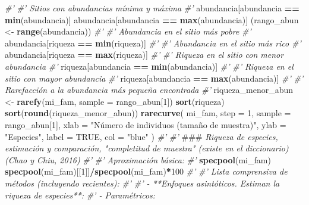 \documentclass[11pt,]{article}
\newenvironment{Shaded}{\begin{snugshade}}{\end{snugshade}}
\newcommand{\KeywordTok}[1]{\textcolor[rgb]{0.13,0.29,0.53}{\textbf{#1}}}
\newcommand{\DataTypeTok}[1]{\textcolor[rgb]{0.13,0.29,0.53}{#1}}
\newcommand{\DecValTok}[1]{\textcolor[rgb]{0.00,0.00,0.81}{#1}}
\newcommand{\StringTok}[1]{\textcolor[rgb]{0.31,0.60,0.02}{#1}}
\newcommand{\CommentTok}[1]{\textcolor[rgb]{0.56,0.35,0.01}{\textit{#1}}}
\newcommand{\OtherTok}[1]{\textcolor[rgb]{0.56,0.35,0.01}{#1}}
\newcommand{\OperatorTok}[1]{\textcolor[rgb]{0.81,0.36,0.00}{\textbf{#1}}}
\newcommand{\AlertTok}[1]{\textcolor[rgb]{0.94,0.16,0.16}{#1}}
\newcommand{\NormalTok}[1]{#1}
\begin{document}
\begin{Shaded}
\begin{Highlighting}[]
{{{{{{{{\CommentTok{#' }
\CommentTok{#' Sitios con abundancias mínima y máxima}
\CommentTok{#' }
\NormalTok{abundancia[abundancia }\OperatorTok{==}\StringTok{ }\KeywordTok{min}\NormalTok{(abundancia)]}
\NormalTok{abundancia[abundancia }\OperatorTok{==}\StringTok{ }\KeywordTok{max}\NormalTok{(abundancia)]}
\NormalTok{(rango_abun <-}\StringTok{ }\KeywordTok{range}\NormalTok{(abundancia))}
\CommentTok{#'}
\CommentTok{#' Abundancia en el sitio más pobre}
\CommentTok{#' }
\NormalTok{abundancia[riqueza }\OperatorTok{==}\StringTok{ }\KeywordTok{min}\NormalTok{(riqueza)]}
\CommentTok{#' }
\CommentTok{#' Abundancia en el sitio más rico}
\CommentTok{#' }
\NormalTok{abundancia[riqueza }\OperatorTok{==}\StringTok{ }\KeywordTok{max}\NormalTok{(riqueza)]}
\CommentTok{#' }
\CommentTok{#' Riqueza en el sitio con menor abundancia}
\CommentTok{#' }
\NormalTok{riqueza[abundancia }\OperatorTok{==}\StringTok{ }\KeywordTok{min}\NormalTok{(abundancia)]}
\CommentTok{#' }
\CommentTok{#' Riqueza en el sitio con mayor abundancia}
\CommentTok{#' }
\NormalTok{riqueza[abundancia }\OperatorTok{==}\StringTok{ }\KeywordTok{max}\NormalTok{(abundancia)]}
\CommentTok{#' }
\CommentTok{#' Rarefacción a la abundancia más pequeña encontrada}
\CommentTok{#' }
\NormalTok{riqueza_menor_abun <-}\StringTok{ }\KeywordTok{rarefy}\NormalTok{(mi_fam, }\DataTypeTok{sample =}\NormalTok{ rango_abun[}\DecValTok{1}\NormalTok{])}
\KeywordTok{sort}\NormalTok{(riqueza)}
\KeywordTok{sort}\NormalTok{(}\KeywordTok{round}\NormalTok{(riqueza_menor_abun))}
\KeywordTok{rarecurve}\NormalTok{(}
\NormalTok{  mi_fam,}
  \DataTypeTok{step =} \DecValTok{1}\NormalTok{,}
  \DataTypeTok{sample =}\NormalTok{ rango_abun[}\DecValTok{1}\NormalTok{],}
  \DataTypeTok{xlab =} \StringTok{"Número de individuos (tamaño de muestra)"}\NormalTok{,}
  \DataTypeTok{ylab =} \StringTok{"Especies"}\NormalTok{,}
  \DataTypeTok{label =} \OtherTok{TRUE}\NormalTok{,}
  \DataTypeTok{col =} \StringTok{"blue"}
\NormalTok{)}
\CommentTok{#' }
\CommentTok{#' }\AlertTok{###}\CommentTok{ Riqueza de especies, estimación y comparación, "completitud de muestra" (existe en el diccionario) (Chao y Chiu, 2016)}
\CommentTok{#' }
\CommentTok{#' Aproximación básica:}
\CommentTok{#' }
\KeywordTok{specpool}\NormalTok{(mi_fam)}
\KeywordTok{specpool}\NormalTok{(mi_fam)[[}\DecValTok{1}\NormalTok{]]}\OperatorTok{/}\KeywordTok{specpool}\NormalTok{(mi_fam)}\OperatorTok{*}\DecValTok{100}
\CommentTok{#' }
\CommentTok{#' Lista comprensiva de métodos (incluyendo recientes):}
\CommentTok{#' }
\CommentTok{#' - **Enfoques asintóticos. Estiman la riqueza de especies**:}
\CommentTok{#'     - Paramétricos:}
}}}}}}}}
\end{Highlighting}
\end{Shaded}
\end{document}
